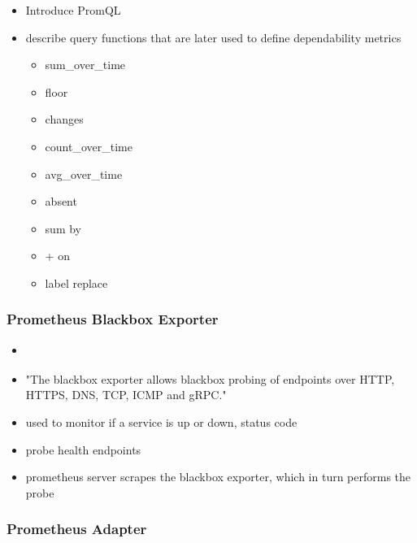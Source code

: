 \begin{itemize}
	\item Introduce PromQL \cite{PrometheusQueryingBasics}
	\item describe query functions that are later used to define dependability metrics \cite{PrometheusQueryingFunctions} \cite{PrometheusQueryingOperators}
	\begin{itemize}
		\item sum\_over\_time
		\item floor
		\item changes
		\item count\_over\_time
		\item avg\_over\_time
		\item absent
		\item sum by
		\item + on
		\item label replace
	\end{itemize}
\end{itemize}

\subsubsection{Prometheus Blackbox Exporter}

\begin{itemize}
	\item \cite{PrometheusBlackboxExporter}
	\item "The blackbox exporter allows blackbox probing of endpoints over HTTP, HTTPS, DNS, TCP, ICMP and gRPC."
	\item used to monitor if a service is up or down, status code
	\item probe health endpoints
	\item prometheus server scrapes the blackbox exporter, which in turn performs the probe
\end{itemize}

\subsubsection{Prometheus Adapter}


